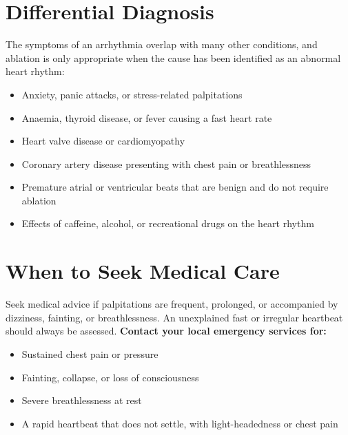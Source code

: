 \section*{Differential Diagnosis}
The symptoms of an arrhythmia overlap with many other conditions, and ablation is only appropriate when the cause has been identified as an abnormal heart rhythm:
\begin{itemize}
    \item Anxiety, panic attacks, or stress-related palpitations
    \item Anaemia, thyroid disease, or fever causing a fast heart rate
    \item Heart valve disease or cardiomyopathy
    \item Coronary artery disease presenting with chest pain or breathlessness
    \item Premature atrial or ventricular beats that are benign and do not require ablation
    \item Effects of caffeine, alcohol, or recreational drugs on the heart rhythm
\end{itemize}

\section*{When to Seek Medical Care}
Seek medical advice if palpitations are frequent, prolonged, or accompanied by dizziness, fainting, or breathlessness. An unexplained fast or irregular heartbeat should always be assessed.
\textbf{Contact your local emergency services for:}
\begin{itemize}
    \item Sustained chest pain or pressure
    \item Fainting, collapse, or loss of consciousness
    \item Severe breathlessness at rest
    \item A rapid heartbeat that does not settle, with light-headedness or chest pain
\end{itemize}

